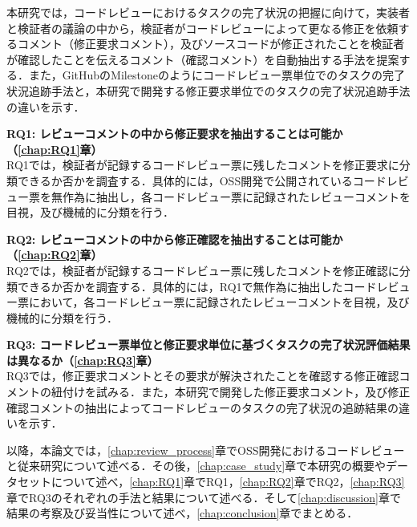 \documentclass[11pt]{jreport}
\newcommand{\RQOne}{レビューコメントの中から修正要求を抽出することは可能か}
\newcommand{\RQTwo}{レビューコメントの中から修正確認を抽出することは可能か}
\newcommand{\RQThree}{コードレビュー票単位と修正要求単位に基づくタスクの完了状況評価結果は異なるか}
\newcommand{\todo}[1]{\colorbox{yellow}{{\bf TODO}:}{\color{red} {\textbf{[#1]}}}}
\begin{document}
本研究では，コードレビューにおけるタスクの完了状況の把握に向けて，実装者と検証者の議論の中から，検証者がコードレビューによって更なる修正を依頼するコメント（修正要求コメント），及びソースコードが修正されたことを検証者が確認したことを伝えるコメント（確認コメント）を自動抽出する手法を提案する．また，GitHubのMilestoneのようにコードレビュー票単位でのタスクの完了状況追跡手法と，本研究で開発する修正要求単位でのタスクの完了状況追跡手法の違いを示す．

\noindent\textbf{RQ1: \RQOne （\ref{chap:RQ1}章）}\\
RQ1では，検証者が記録するコードレビュー票に残したコメントを修正要求に分類できるか否かを調査する．具体的には，OSS開発で公開されているコードレビュー票を無作為に抽出し，各コードレビュー票に記録されたレビューコメントを目視，及び機械的に分類を行う．

\noindent\textbf{RQ2: \RQTwo （\ref{chap:RQ2}章）}\\
RQ2では，検証者が記録するコードレビュー票に残したコメントを修正確認に分類できるか否かを調査する．具体的には，RQ1で無作為に抽出したコードレビュー票において，各コードレビュー票に記録されたレビューコメントを目視，及び機械的に分類を行う．

\noindent\textbf{RQ3: \RQThree （\ref{chap:RQ3}章）}\\
RQ3では，修正要求コメントとその要求が解決されたことを確認する修正確認コメントの紐付けを試みる．また，本研究で開発した修正要求コメント，及び修正確認コメントの抽出によってコードレビューのタスクの完了状況の追跡結果の違いを示す．

以降，本論文では，\ref{chap:review_process}章でOSS開発におけるコードレビューと従来研究について述べる．その後，\ref{chap:case_study}章で本研究の概要やデータセットについて述べ，\ref{chap:RQ1}章でRQ1，\ref{chap:RQ2}章でRQ2，\ref{chap:RQ3}章でRQ3のそれぞれの手法と結果について述べる．そして\ref{chap:discussion}章で結果の考察及び妥当性について述べ，\ref{chap:conclusion}章でまとめる．


\end{document}
